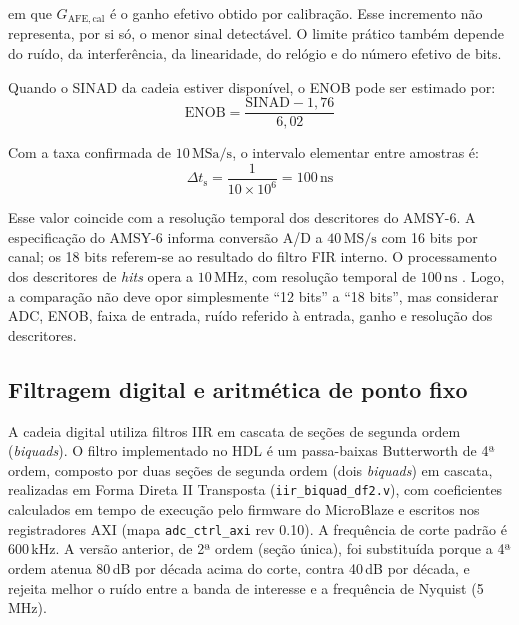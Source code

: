 \noindent
em que \(G_{\mathrm{AFE,cal}}\) é o ganho efetivo obtido por calibração. Esse incremento não representa, por si só, o menor sinal detectável. O limite prático também depende do ruído, da interferência, da linearidade, do relógio e do número efetivo de bits.

Quando o SINAD da cadeia estiver disponível, o ENOB pode ser estimado por:
\begin{equation}
	\mathrm{ENOB} = \frac{\mathrm{SINAD}-1{,}76}{6{,}02}
	\label{v2:eq:enob}
\end{equation}

Com a taxa confirmada de \(10\,\mathrm{MSa/s}\), o intervalo elementar entre amostras é:
\begin{equation}
	\Delta t_{\mathrm{s}} = \frac{1}{10\times10^6} = 100\,\mathrm{ns}
	\label{v2:eq:resolucao_temporal_8msps}
\end{equation}

Esse valor coincide com a resolução temporal dos descritores do AMSY-6. A especificação do AMSY-6 informa conversão A/D a \(40\,\mathrm{MS/s}\) com 16 bits por canal; os 18 bits referem-se ao resultado do filtro FIR interno. O processamento dos descritores de \textit{hits} opera a \(10\,\mathrm{MHz}\), com resolução temporal de \(100\,\mathrm{ns}\) \cite{vallen2022}. Logo, a comparação não deve opor simplesmente ``12 bits'' a ``18 bits'', mas considerar ADC, ENOB, faixa de entrada, ruído referido à entrada, ganho e resolução dos descritores.

\subsection{Filtragem digital e aritmética de ponto fixo}
\label{v2:subsec:filtragem_digital}

A cadeia digital utiliza filtros IIR em cascata de seções de segunda ordem (\textit{biquads}). O filtro implementado no HDL é um passa-baixas Butterworth de 4ª ordem, composto por duas seções de segunda ordem (dois \textit{biquads}) em cascata, realizadas em Forma Direta II Transposta (\texttt{iir\_biquad\_df2.v}), com coeficientes calculados em tempo de execução pelo firmware do MicroBlaze e escritos nos registradores AXI (mapa \texttt{adc\_ctrl\_axi} rev 0.10). A frequência de corte padrão é 600\,kHz. A versão anterior, de 2ª ordem (seção única), foi substituída porque a 4ª ordem atenua 80\,dB por década acima do corte, contra 40\,dB por década, e rejeita melhor o ruído entre a banda de interesse e a frequência de Nyquist (5\,MHz).

